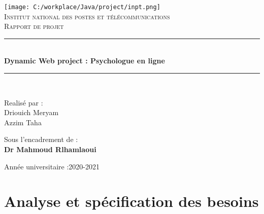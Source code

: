 \documentclass[12]{article}
\newcommand{\HRule}{\rule{\linewidth}{0.5mm}}
\begin{document}
\onehalfspacing


\begin{titlepage}
  \begin{sffamily}
  \begin{center}

    \texttt{[image: C:/workplace/Java/project/inpt.png]}~\\[1.5cm]

    \textsc{\LARGE Institut national des postes et télécommunications}\\[2cm]

    \textsc{\Large Rapport de projet}\\[1.5cm]

    \HRule \\[0.4cm]
    { \huge \bfseries  Dynamic Web project :
    Psychologue en ligne \\[0.1cm] }

    \HRule \\[2cm]


    \begin{minipage}{0.4\textwidth}
      \begin{flushleft} \large
       Realisé par :\\
        Driouich Meryam\\
        Azzim Taha\\
      \end{flushleft}
    \end{minipage}
    \begin{minipage}{0.4\textwidth}
      \begin{flushright} \large
       Sous l'encadrement de :\\ \textbf{Dr Mahmoud Rlhamlaoui}
      \end{flushright}
    \end{minipage}

    \vfill

    {\large  Année universitaire :2020-2021}

  \end{center}
  \end{sffamily}
\end{titlepage}
\tableofcontents

\newpage




\section{Analyse et spécification des besoins}
\end{document}
